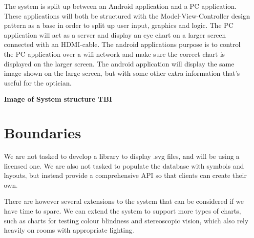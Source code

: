 \documentclass[12pt,a4paper,notitlepage]{report}
\begin{document}
The system is split up between an Android application and a PC application. These applications will both be structured with the Model-View-Controller design pattern as a base in order to split up user input, graphics and logic. The PC application will act as a server and display an eye chart on a larger screen connected with an HDMI-cable. The android applications purpose is to control the PC-application over a wifi network and make sure the correct chart is displayed on the larger screen. The android application will display the same image shown on the large screen, but with some other extra information that's useful for the optician.

\textbf{Image of System structure TBI}



\section{Boundaries}


We are not tasked to develop a library to display .svg files, and will be using a licensed one. We are also not tasked to populate the database with symbols and layouts, but instead provide a comprehensive API so that clients can create their own.


There are however several extensions to the system that can be considered if we have time to spare. We can extend the system to support more types of charts, such as charts for testing colour blindness and stereoscopic vision, which also rely heavily on rooms with appropriate lighting.
\end{document}
